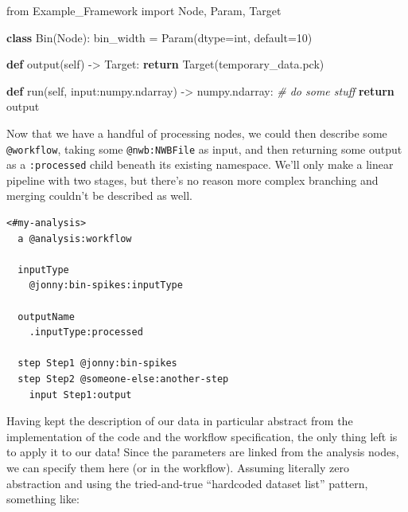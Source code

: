 \documentclass[10pt]{tufte-book}
\newenvironment{Shaded}{}{}
\newcommand{\BuiltInTok}[1]{#1}
\newcommand{\CommentTok}[1]{\textcolor[rgb]{0.38,0.63,0.69}{\textit{#1}}}
\newcommand{\ControlFlowTok}[1]{\textcolor[rgb]{0.00,0.44,0.13}{\textbf{#1}}}
\newcommand{\DecValTok}[1]{\textcolor[rgb]{0.25,0.63,0.44}{#1}}
\newcommand{\ImportTok}[1]{#1}
\newcommand{\KeywordTok}[1]{\textcolor[rgb]{0.00,0.44,0.13}{\textbf{#1}}}
\newcommand{\NormalTok}[1]{#1}
\newcommand{\OperatorTok}[1]{\textcolor[rgb]{0.40,0.40,0.40}{#1}}
\newcommand{\StringTok}[1]{\textcolor[rgb]{0.25,0.44,0.63}{#1}}
\newcommand{\VariableTok}[1]{\textcolor[rgb]{0.10,0.09,0.49}{#1}}
\begin{document}
\begin{Shaded}
\begin{Highlighting}[]
\ImportTok{from}\NormalTok{ Example\_Framework }\ImportTok{import}\NormalTok{ Node, Param, Target}

\KeywordTok{class}\NormalTok{ Bin(Node):}
\NormalTok{  bin\_width }\OperatorTok{=}\NormalTok{ Param(dtype}\OperatorTok{=}\BuiltInTok{int}\NormalTok{, default}\OperatorTok{=}\DecValTok{10}\NormalTok{)}

  \KeywordTok{def}\NormalTok{ output(}\VariableTok{self}\NormalTok{) }\OperatorTok{{-}\textgreater{}}\NormalTok{ Target:}
    \ControlFlowTok{return}\NormalTok{ Target(}\StringTok{\textquotesingle{}temporary\_data.pck\textquotesingle{}}\NormalTok{)}

  \KeywordTok{def}\NormalTok{ run(}\VariableTok{self}\NormalTok{, }\BuiltInTok{input}\NormalTok{:}\StringTok{\textquotesingle{}numpy.ndarray\textquotesingle{}}\NormalTok{) }\OperatorTok{{-}\textgreater{}} \StringTok{\textquotesingle{}numpy.ndarray\textquotesingle{}}\NormalTok{:}
    \CommentTok{\# do some stuff}
    \ControlFlowTok{return}\NormalTok{ output}
\end{Highlighting}
\end{Shaded}

Now that we have a handful of processing nodes, we could then describe
some \texttt{@workflow}, taking some \texttt{@nwb:NWBFile} as input, and
then returning some output as a \texttt{:processed} child beneath its
existing namespace. We'll only make a linear pipeline with two stages,
but there's no reason more complex branching and merging couldn't be
described as well.

\begin{verbatim}
<#my-analysis>
  a @analysis:workflow

  inputType 
    @jonny:bin-spikes:inputType

  outputName
    .inputType:processed

  step Step1 @jonny:bin-spikes
  step Step2 @someone-else:another-step
    input Step1:output
\end{verbatim}

Having kept the description of our data in particular abstract from the
implementation of the code and the workflow specification, the only
thing left is to apply it to our data! Since the parameters are linked
from the analysis nodes, we can specify them here (or in the workflow).
Assuming literally zero abstraction and using the tried-and-true
``hardcoded dataset list'' pattern, something like:
\end{document}
